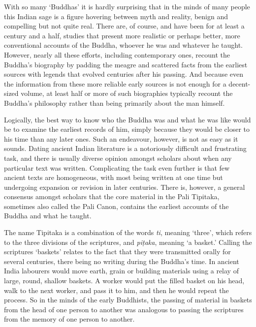 With so many `Buddhas' it is hardly surprising that in the minds of many
people this Indian sage is a figure hovering between myth and reality,
benign and compelling but not quite real. There are, of course, and have
been for at least a century and a half, studies that present more
realistic or perhaps better, more conventional accounts of the Buddha,
whoever he was and whatever he taught. However, nearly all these
efforts, including contemporary ones, recount the Buddha's biography by
padding the meagre and scattered facts from the earliest sources with
legends that evolved centuries after his passing. And because even the
information from these more reliable early sources is not enough for a
decent-sized volume, at least half or more of such biographies typically
recount the Buddha's philosophy rather than being primarily about the
man himself.

Logically, the best way to know who the Buddha was and what he was like
would be to examine the earliest records of him, simply because they
would be closer to his time than any later ones. Such an endeavour,
however, is not as easy as it sounds. Dating ancient Indian literature
is a notoriously difficult and frustrating task, and there is usually
diverse opinion amongst scholars about when any particular text was
written. Complicating the task even further is that few ancient texts
are homogeneous, with most being written at one time but undergoing
expansion or revision in later centuries. There is, however, a general
consensus amongst scholars that the core material in the Pali Tipitaka,
sometimes also called the Pali Canon, contains the earliest accounts of
the Buddha and what he taught.

The name Tipitaka is a combination of the words \emph{ti}, meaning
`three', which refers to the three divisions of the scriptures, and
\emph{piṭaka}, meaning `a basket.' Calling the scriptures `baskets'
relates to the fact that they were transmitted orally for several
centuries, there being no writing during the Buddha's time. In ancient
India labourers would move earth, grain or building materials using a
relay of large, round, shallow baskets. A worker would put the filled
basket on his head, walk to the next worker, and pass it to him, and
then he would repeat the process. So in the minds of the early
Buddhists, the passing of material in baskets from the head of one
person to another was analogous to passing the scriptures from the
memory of one person to another.

